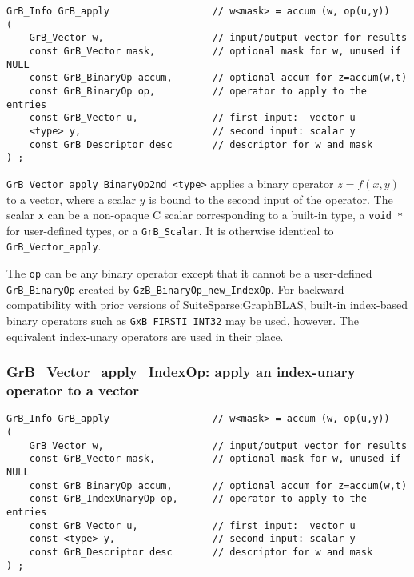 \documentclass[12pt]{article}
\begin{document}
\begin{mdframed}[userdefinedwidth=6in]
{\footnotesize
\begin{verbatim}
GrB_Info GrB_apply                  // w<mask> = accum (w, op(u,y))
(
    GrB_Vector w,                   // input/output vector for results
    const GrB_Vector mask,          // optional mask for w, unused if NULL
    const GrB_BinaryOp accum,       // optional accum for z=accum(w,t)
    const GrB_BinaryOp op,          // operator to apply to the entries
    const GrB_Vector u,             // first input:  vector u
    <type> y,                       // second input: scalar y
    const GrB_Descriptor desc       // descriptor for w and mask
) ;
\end{verbatim} } \end{mdframed}

\verb'GrB_Vector_apply_BinaryOp2nd_<type>'  applies a binary operator
$z=f(x,y)$ to a vector, where a scalar $y$ is bound to the second input of the
operator.
The scalar \verb'x' can be a non-opaque C scalar corresponding to a built-in
type, a \verb'void *' for user-defined types, or a \verb'GrB_Scalar'.
It is otherwise identical to \verb'GrB_Vector_apply'.

The \verb'op' can be any binary operator except that it cannot be a
user-defined \verb'GrB_BinaryOp' created by \verb'GzB_BinaryOp_new_IndexOp'.
For backward compatibility with prior versions of SuiteSparse:GraphBLAS,
built-in index-based binary operators such as \verb'GxB_FIRSTI_INT32' may be
used, however.  The equivalent index-unary operators are used in their place.

\subsubsection{{\sf GrB\_Vector\_apply\_IndexOp:} apply an index-unary operator to a vector}
\label{vector_apply_idxunop}

\begin{mdframed}[userdefinedwidth=6in]
{\footnotesize
\begin{verbatim}
GrB_Info GrB_apply                  // w<mask> = accum (w, op(u,y))
(
    GrB_Vector w,                   // input/output vector for results
    const GrB_Vector mask,          // optional mask for w, unused if NULL
    const GrB_BinaryOp accum,       // optional accum for z=accum(w,t)
    const GrB_IndexUnaryOp op,      // operator to apply to the entries
    const GrB_Vector u,             // first input:  vector u
    const <type> y,                 // second input: scalar y
    const GrB_Descriptor desc       // descriptor for w and mask
) ;
\end{verbatim} } \end{mdframed}
\end{document}

